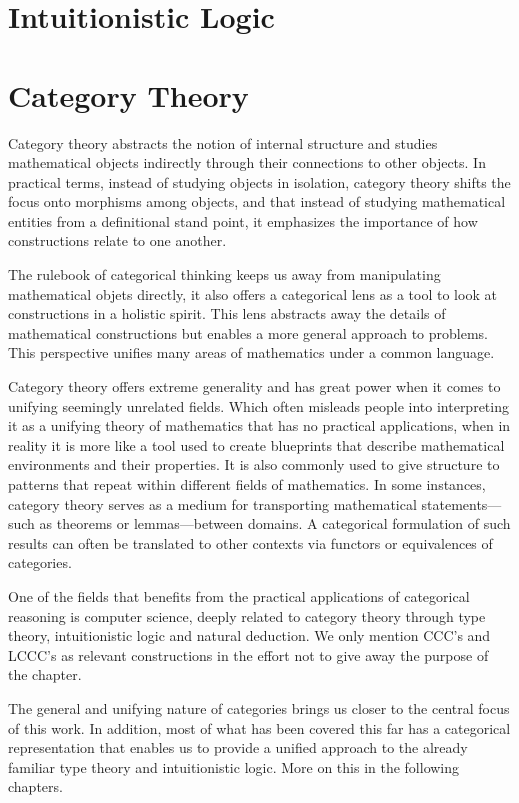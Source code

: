 \documentclass[12pt]{book}
\begin{document}
\chapter{Intuitionistic Logic}
\newpage


\chapter{Category Theory}

Category theory abstracts the notion of internal structure and studies mathematical objects indirectly through their connections to other objects. In practical terms, instead of studying objects in isolation, category theory shifts the focus onto morphisms among objects, and that instead of studying mathematical entities from a definitional stand point, it emphasizes the importance of how constructions relate to one another.

The rulebook of categorical thinking keeps us away from manipulating mathematical objets directly, it also offers a categorical lens as a tool to look at constructions in a holistic spirit. This lens abstracts away the details of mathematical constructions but enables a more general approach to  problems. This perspective unifies many areas of mathematics under a common language.

Category theory offers extreme generality and has great power when it comes to unifying seemingly unrelated fields. Which often misleads people into interpreting it as a unifying theory of mathematics that has no practical applications, when in reality it is more like a tool used to create blueprints that describe mathematical environments and their properties. It is also commonly used to give structure to patterns that repeat within different fields of mathematics. In some instances, category theory serves as a medium for transporting mathematical statements—such as theorems or lemmas—between domains. A categorical formulation of such results can often be translated to other contexts via functors or equivalences of categories.

One of the fields that benefits from the practical applications of categorical reasoning is computer science, deeply related to category theory through type theory, intuitionistic logic and natural deduction. We only mention CCC's and LCCC's as relevant constructions in the effort not to give away the purpose of the chapter.

The general and unifying nature of categories brings us closer to the central focus of this work. In addition, most of what has been covered this far has a categorical representation that enables us to provide a unified approach to the already familiar type theory and intuitionistic logic. More on this in the following chapters.


\newpage

\end{document}
